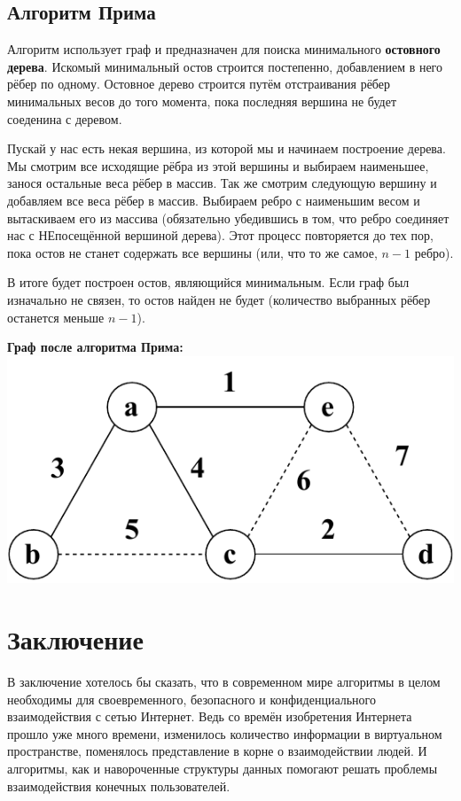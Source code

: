 \documentclass[utf8,14pt,a4paper,oneside,russian]{book}
\begin{document}
	\subsection{Алгоритм Прима}
	
	Алгоритм использует граф и предназначен для поиска минимального \textbf{остовного дерева}. Искомый минимальный остов строится постепенно, добавлением в него рёбер по одному. Остовное дерево строится путём отстраивания рёбер минимальных весов до того момента, пока последняя вершина не будет соеденина с деревом. 
	
	Пускай у нас есть некая вершина, из которой мы и начинаем построение дерева. Мы смотрим все исходящие рёбра из этой вершины и выбираем наименьшее, занося остальные веса рёбер в массив. Так же смотрим следующую вершину и добавляем все веса рёбер в массив. Выбираем ребро с наименьшим весом и вытаскиваем его из массива (обязательно убедившись в том, что ребро соединяет нас с НЕпосещённой вершиной дерева). Этот процесс повторяется до тех пор, пока остов не станет содержать все вершины (или, что то же самое, $n-1$ ребро).
	
	В итоге будет построен остов, являющийся минимальным. Если граф был изначально не связен, то остов найден не будет (количество выбранных рёбер останется меньше $n-1$).
	
	\begin{center}
		\textbf{Граф после алгоритма Прима:}\\
		\includegraphics[scale=0.8]{prima}\\
	\end{center}

	\newpage
	\section{Заключение}
	
	В заключение хотелось бы сказать, что в современном мире алгоритмы в целом необходимы для своевременного, безопасного и конфиденциального взаимодействия с сетью Интернет. Ведь со времён изобретения Интернета прошло уже много времени, изменилось количество информации в виртуальном пространстве, поменялось представление в корне о взаимодействии людей. И алгоритмы, как и навороченные структуры данных помогают решать проблемы взаимодействия конечных пользователей.
\end{document}
